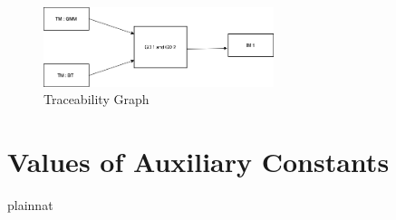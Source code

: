 \documentclass[12pt]{article}
\begin{document}
\begin{figure}[h!]
\begin{center}
 \includegraphics[width=0.6\textwidth]{trace_matrix.png}
\caption{Traceability Graph}
\label{Traceability Graph} 
\end{center}
\end{figure}





\section{Values of Auxiliary Constants}


\newpage
\nocite{*} 
 {plainnat}
 
\end{document}
